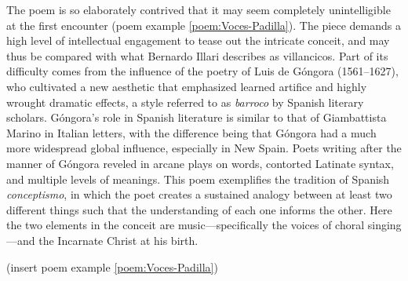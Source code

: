 The poem is so elaborately contrived that it may seem completely unintelligible
at the first encounter (poem example \ref{poem:Voces-Padilla}).%
    \Autocites
    [37--38, 119--132]{Cashner:WLSCM32}
    [133--203]{Cashner:PhD}
The piece demands a high level of intellectual engagement to tease out the
intricate conceit, and may thus be compared with what Bernardo Illari describes
as  villancicos.%
    \Autocite[vol. 2, 304--308]{Illari:Polychoral}
Part of its difficulty comes from the influence of the poetry of Luis de Góngora
(1561--1627), who cultivated a new aesthetic that emphasized learned artifice
and highly wrought dramatic effects, a style referred to as \emph{barroco} by
Spanish literary scholars.%
    \Autocites
    [222--235]{Gaylord:Poetry}
    [vol. 1, 1014--1061]{Valbuena:Literatura}
Góngora's role in Spanish literature is similar to that of Giambattista Marino
in Italian letters, with the difference being that Góngora had a much more
widespread global influence, especially in New Spain.%
    \Autocite{Tenorio:Gongorismo}
Poets writing after the manner of Góngora reveled in arcane plays on words,
contorted Latinate syntax, and multiple levels of meanings.
This poem exemplifies the tradition of Spanish \emph{conceptismo}, in which the
poet creates a sustained analogy between at least two different things such that
the understanding of each one informs the other.
Here the two elements in the conceit are music---specifically the voices of
choral singing---and the Incarnate Christ at his birth.

(insert poem example \ref{poem:Voces-Padilla})
\label{poem:Voces-Padilla}

